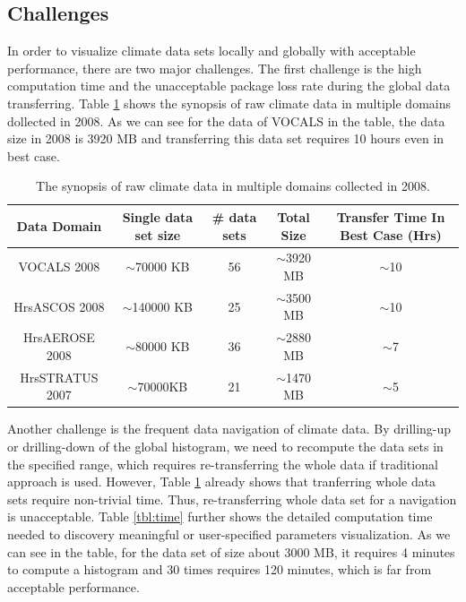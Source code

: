 \documentclass[times, 10pt,onecolumn]{article} %
\begin{document}
\subsection{Challenges} 
In order to visualize climate data sets locally and globally with acceptable performance, there are two major challenges. The first challenge is the high computation time and the unacceptable package loss rate during the global data transferring. Table \ref{tbl:rawdata} shows the synopsis of raw climate data in multiple domains dollected in 2008. As we can see for the data of VOCALS in the table, the data size in 2008 is 3920 MB and transferring this data set requires 10 hours even in best case.

\begin{table}[!iht]
\centering
\begin{tabular}{|c|c|c|c|c|}
\hline
\textbf{Data Domain} & \textbf{Single data set size} & \textbf{\# data sets} & \textbf{Total Size} & \textbf{ Transfer Time In Best Case (Hrs)} \\ \hline
VOCALS 2008 & $\sim$70000 KB & 56 & $\sim$3920 MB & $\sim$10 \\ \hline
HrsASCOS 2008 & $\sim$140000 KB & 25&  $\sim$3500 MB & $\sim$10 \\ \hline 
HrsAEROSE 2008 & $\sim$80000 KB & 36&  $\sim$2880 MB & $\sim$7 \\ \hline 
HrsSTRATUS 2007 & $\sim$70000KB & 21&  $\sim$1470 MB & $\sim$5  \\ \hline
\end{tabular}
\caption{The synopsis of raw climate data in multiple domains collected in 2008.}
\label{tbl:rawdata}
\end{table}

Another challenge is the frequent data navigation of climate data. By drilling-up or drilling-down of the global histogram, we need to recompute the data sets in the specified range, which requires re-transferring the whole data if traditional approach is used. However, Table \ref{tbl:rawdata} already shows that tranferring whole data sets require non-trivial time. Thus, re-transferring whole data set for a navigation is unacceptable. Table \ref{tbl:time} further shows the detailed computation time needed to discovery meaningful or user-specified parameters visualization. As we can see in the table, for the data set of size about 3000 MB, it requires 4 minutes to compute a histogram and 30 times requires 120 minutes, which is far from acceptable performance. 
\end{document}
